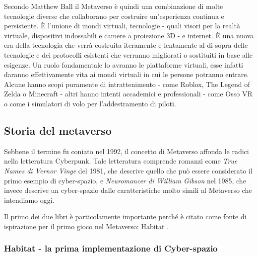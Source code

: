     Secondo Matthew Ball il Metaverso è quindi una combinazione di molte tecnologie diverse che collaborano per costruire un'esperienza continua e persistente.
    È l'unione di mondi virtuali, tecnologie - quali visori per la realtà virtuale, dispositivi indossabili e camere a proiezione 3D - e internet.
    È una nuova era della tecnologia che verrà costruita iteramente e lentamente al di sopra delle tecnologie e dei protocolli esistenti che verranno migliorati o sostituiti in base alle esigenze.
    Un ruolo fondamentale lo avranno le piattaforme virtuali, esse infatti daranno effettivamente vita ai mondi virtuali in cui le persone potranno entrare.
    Alcune hanno scopi puramente di intrattenimento - come Roblox, The Legend of Zelda o Minecraft - altri hanno intenti accademici e professionali - come Osso VR o come i simulatori di volo per l'addestramento di piloti.


    \subsection{Storia del metaverso}
    Sebbene il termine fu coniato nel 1992, il concetto di Metaverso affonda le radici nella letteratura Cyberpunk.
    Tale letteratura comprende romanzi come \textit{True Names di Vernor Vinge} del 1981, che descrive quello che può essere considerato il primo esempio di cyber-spazio, e \textit{Neuromancer di William Gibson} nel 1985, che invece descrive un cyber-spazio dalle caratteristiche molto simili al Metaverso che intendiamo oggi.

    Il primo dei due libri è particolamente importante perché è citato come fonte di ispirazione per il primo gioco nel Metaverso: Habitat \cite{Habitat1990}.

        \subsubsection{Habitat - la prima implementazione di Cyber-spazio}

